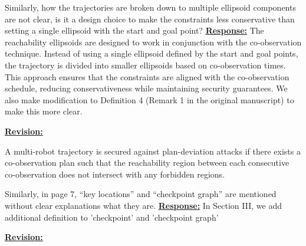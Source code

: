 \documentclass{article}
\newcommand{\re}{\tcblower \underline{\textbf{Response:}}}
\newcommand{\rv}{{\large{\underline{\textbf{Revision:}}}}\quad}
\newcommand{\news}{\color{blue}}
\begin{document}
\vspace{0.3cm}

\begin{cmt}{}{}
	Similarly, how the
	trajectories are broken down to multiple ellipsoid components are not
	clear, is it a design choice to make the constraints less conservative
	than setting a single ellipsoid with the start and goal point?
	\re 
	The reachability ellipsoids are designed to work in conjunction with the co-observation technique. Instead of using a single ellipsoid defined by the start and goal points, the trajectory is divided into smaller ellipsoids based on co-observation times. This approach ensures that the constraints are aligned with the co-observation schedule, reducing conservativeness while maintaining security guarantees. We also make modification to Definition 4 (Remark 1 in the original manuscript) to make this more clear.
\end{cmt}
\rv
{\news \setcounter{definition}{3}
 \begin{definition}\label{rmk:revised-security}
	A multi-robot trajectory is secured against plan-deviation attacks if there exists a co-observation plan such that the reachability region between each consecutive co-observation does not intersect with any forbidden regions.
\end{definition}}

\vspace{0.3cm}
\begin{cmt}{}{}
	Similarly, in page 7, “key locations” and “checkpoint graph” are
	mentioned without clear explanations what they are.
	\re  
	In Section III, we add additional definition to 'checkpoint' and 'checkpoint graph'
\end{cmt}
\rv
\end{document}
